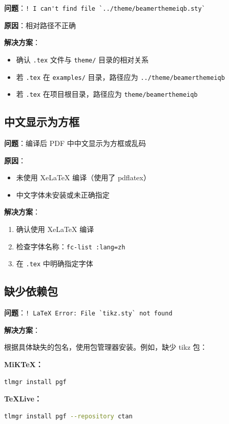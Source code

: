 \textbf{问题}：\lstinline|! I can't find file `../theme/beamerthemeiqb.sty`|

\textbf{原因}：相对路径不正确

\textbf{解决方案}：
\begin{itemize}
    \item 确认 \lstinline|.tex| 文件与 \lstinline|theme/| 目录的相对关系
    \item 若 \lstinline|.tex| 在 \lstinline|examples/| 目录，路径应为 \lstinline|../theme/beamerthemeiqb|
    \item 若 \lstinline|.tex| 在项目根目录，路径应为 \lstinline|theme/beamerthemeiqb|
\end{itemize}

\subsection{中文显示为方框}

\textbf{问题}：编译后 PDF 中中文显示为方框或乱码

\textbf{原因}：
\begin{itemize}
    \item 未使用 XeLaTeX 编译（使用了 pdflatex）
    \item 中文字体未安装或未正确指定
\end{itemize}

\textbf{解决方案}：
\begin{enumerate}
    \item 确认使用 XeLaTeX 编译
    \item 检查字体名称：\lstinline|fc-list :lang=zh|
    \item 在 \lstinline|.tex| 中明确指定字体
\end{enumerate}

\subsection{缺少依赖包}

\textbf{问题}：\lstinline|! LaTeX Error: File `tikz.sty` not found|

\textbf{解决方案}：

根据具体缺失的包名，使用包管理器安装。例如，缺少 tikz 包：

\textbf{MiKTeX：}
\begin{lstlisting}[style=blockstyle,language=bash]
tlmgr install pgf
\end{lstlisting}

\textbf{TeXLive：}
\begin{lstlisting}[style=blockstyle,language=bash]
tlmgr install pgf --repository ctan
\end{lstlisting}

